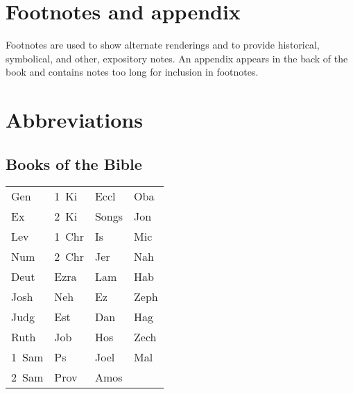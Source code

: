 \section{Footnotes and appendix}
Footnotes are used to show alternate renderings and to provide historical, symbolical, and other, expository notes. An appendix appears in the back of the book and contains notes too long for inclusion in footnotes.

\section{Abbreviations}
\subsection{Books of the Bible}
\begin{table}[!h]
    \centering
    \setlength\tabcolsep{1.75em}
    \begin{tabular}{llll}
        Gen   & 1~Ki  & Eccl  & Oba  \\
        Ex    & 2~Ki  & Songs & Jon  \\
        Lev   & 1~Chr & Is    & Mic  \\
        Num   & 2~Chr & Jer   & Nah  \\
        Deut  & Ezra  & Lam   & Hab  \\
        Josh  & Neh   & Ez    & Zeph \\
        Judg  & Est   & Dan   & Hag  \\
        Ruth  & Job   & Hos   & Zech \\
        1~Sam & Ps    & Joel  & Mal  \\
        2~Sam & Prov  & Amos  & ~
    \end{tabular}
\end{table}

